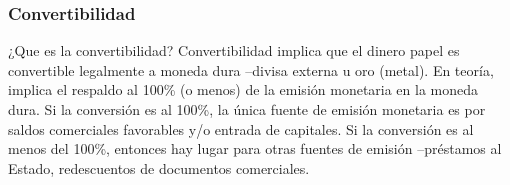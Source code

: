 \documentclass[14pt,aspectratio=169]{beamer}
\begin{document}
        


 \begin{frame}\frametitle{Convertibilidad}
     \begin{block}{¿Que es la convertibilidad?}
    Convertibilidad implica que el dinero papel es convertible
    legalmente a moneda dura --divisa externa u oro (metal). En
    teoría, implica el respaldo al 100\% (o menos) de la emisión
    monetaria en la moneda dura. Si la conversión es al 100\%, la
    única fuente de emisión monetaria es por saldos comerciales
    favorables y/o entrada de capitales. Si la conversión es al menos
    del 100\%, entonces hay lugar para otras fuentes de emisión
    --préstamos al Estado, redescuentos de documentos comerciales.  
       \end{block}
        \end{frame}
        
\end{document}
